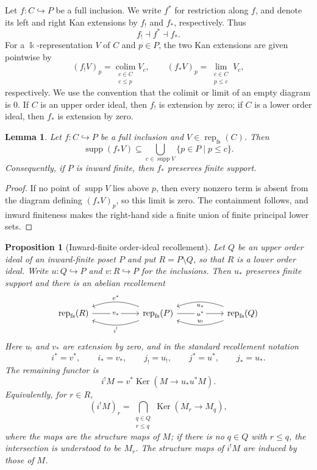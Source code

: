 \documentclass[12pt,reqno]{amsart}
\newtheorem{proposition}[theorem]{Proposition}
\newtheorem{lemma}[theorem]{Lemma}
\theoremstyle{definition}
\theoremstyle{remark}
\newcommand{\Rep}{\operatorname{rep}}
\begin{document}
Let $f:C\hookrightarrow P$ be a full inclusion.  We write $f^*$ for
restriction along $f$, and denote its left and right Kan extensions by
$f_!$ and $f_*$, respectively.  Thus
\[
f_!\dashv f^*\dashv f_*.
\]
For a $\Bbbk$-representation $V$ of $C$ and $p\in P$, the two Kan extensions are
given pointwise by
\[
(f_!V)_p=\operatorname*{colim}_{\substack{c\in C\\c\le p}}V_c,
\qquad
(f_*V)_p=\operatorname*{lim}_{\substack{c\in C\\p\le c}}V_c,
\]
respectively.  We use the convention that the colimit or limit of an empty
diagram is $0$.  If $C$ is an upper order ideal, then $f_!$ is extension by
zero; if $C$ is a lower order ideal, then $f_*$ is extension by zero.

\begin{lemma}\label{lem:fs-kan-support}
Let $f:C\hookrightarrow P$ be a full inclusion and
$V\in\Rep_{\mathrm{fs}}(C)$.  Then
\[
\operatorname{supp}(f_*V)
\subseteq\bigcup_{c\in\operatorname{supp}V}\{p\in P\mid p\le c\}.
\]
Consequently, if $P$ is inward finite, then $f_*$ preserves finite support.
\end{lemma}

\begin{proof}
If no point of $\operatorname{supp}V$ lies above $p$, then every nonzero term
is absent from the diagram defining $(f_*V)_p$, so this limit is zero.  The
containment follows, and inward finiteness makes the right-hand side a finite
union of finite principal lower sets.
\end{proof}

\begin{proposition}[Inward-finite order-ideal recollement]
\label{prop:fs-order-recollement}
Let $Q$ be an upper order ideal of an inward-finite poset $P$ and put
$R=P\setminus Q$, so that $R$ is a lower order ideal.  Write
$u:Q\hookrightarrow P$ and $v:R\hookrightarrow P$ for the inclusions.  Then
$u_*$ preserves finite support and there is an abelian recollement
\[
\begin{tikzcd}[column sep=5.5em]
\Rep_{\mathrm{fs}}(R)
  \arrow[r, "v_*" description]
& \Rep_{\mathrm{fs}}(P)
  \arrow[l, bend right=20, "v^*"']
  \arrow[l, bend left=20, "i^!"]
  \arrow[r, "u^*" description]
& \Rep_{\mathrm{fs}}(Q)
  \arrow[l, bend left=20, "u_!"']
  \arrow[l, bend right=20, "u_*"]
\end{tikzcd}
\]
Here $u_!$ and $v_*$ are extension by zero, and in the standard recollement
notation
\[
i^*=v^*,\qquad i_*=v_*,\qquad
j_!=u_!,\qquad j^*=u^*,\qquad j_*=u_*.
\]
The remaining functor is
\[
i^!M
=
v^*\operatorname{Ker}\!\left(M\longrightarrow u_*u^*M\right).
\]
Equivalently, for $r\in R$,
\[
(i^!M)_r
=
\bigcap_{\substack{q\in Q\\ r\le q}}
\operatorname{Ker}(M_r\longrightarrow M_q),
\]
where the maps are the structure maps of $M$; if there is no $q\in Q$ with
$r\le q$, the intersection is understood to be $M_r$.  The structure maps
of $i^!M$ are induced by those of $M$.


\end{proposition}
\end{document}
